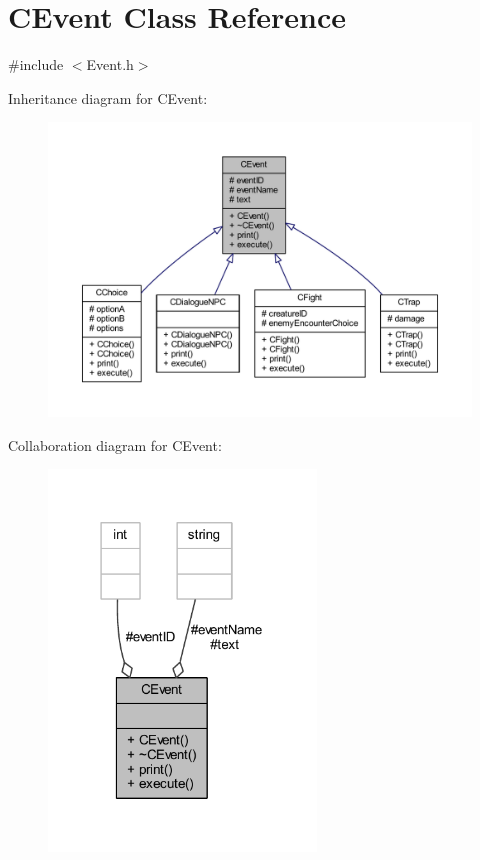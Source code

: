 \hypertarget{class_c_event}{}\section{C\+Event Class Reference}
\label{class_c_event}


{\ttfamily \#include $<$Event.\+h$>$}



Inheritance diagram for C\+Event\+:\nopagebreak
\begin{figure}[H]
\begin{center}
\leavevmode
\includegraphics[width=350pt]{class_c_event__inherit__graph}
\end{center}
\end{figure}


Collaboration diagram for C\+Event\+:\nopagebreak
\begin{figure}[H]
\begin{center}
\leavevmode
\includegraphics[width=202pt]{class_c_event__coll__graph}
\end{center}
\end{figure}
